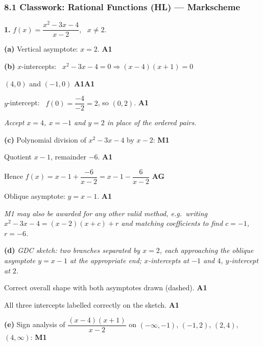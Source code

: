 \documentclass[12pt, twoside]{article}
\begin{document}
\subsubsection*{8.1 Classwork: Rational Functions (HL) --- Markscheme}

\medskip

\noindent\textbf{1.} $\displaystyle f(x)=\dfrac{x^{2}-3x-4}{x-2}$, \ $x\ne 2$.

\medskip

\textbf{(a)} Vertical asymptote: $x=2$. \hfill \textbf{A1}

\medskip

\textbf{(b)} $x$-intercepts: \ $x^{2}-3x-4=0 \Rightarrow (x-4)(x+1)=0$

$(4,0)$ and $(-1,0)$ \hfill \textbf{A1A1}

$y$-intercept: \ $f(0)=\dfrac{-4}{-2}=2$, so $(0,2)$. \hfill \textbf{A1}

\emph{Accept $x=4$, $x=-1$ and $y=2$ in place of the ordered pairs.}

\medskip

\textbf{(c)} Polynomial division of $x^{2}-3x-4$ by $x-2$: \hfill \textbf{M1}

Quotient $x-1$, remainder $-6$. \hfill \textbf{A1}

Hence $\displaystyle f(x)=x-1+\dfrac{-6}{x-2}=x-1-\dfrac{6}{x-2}$ \hfill \textbf{AG}

Oblique asymptote: $y=x-1$. \hfill \textbf{A1}

\emph{M1 may also be awarded for any other valid method, e.g.\ writing
$x^{2}-3x-4=(x-2)(x+c)+r$ and matching coefficients to find $c=-1$, $r=-6$.}

\medskip

\textbf{(d)} \emph{GDC sketch: two branches separated by $x=2$, each approaching the
oblique asymptote $y=x-1$ at the appropriate end; $x$-intercepts at $-1$ and $4$,
$y$-intercept at $2$.}

Correct overall shape with both asymptotes drawn (dashed). \hfill \textbf{A1}

All three intercepts labelled correctly on the sketch. \hfill \textbf{A1}

\medskip

\textbf{(e)} Sign analysis of $\dfrac{(x-4)(x+1)}{x-2}$ on $(-\infty,-1)$,
$(-1,2)$, $(2,4)$, $(4,\infty)$: \hfill \textbf{M1}
\end{document}
